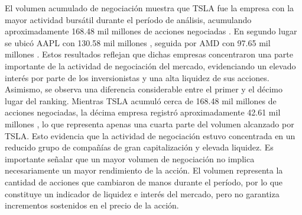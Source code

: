 El volumen acumulado de negociación muestra que
TSLA
fue la empresa con la mayor actividad bursátil durante el período de análisis, acumulando aproximadamente
168.48 mil millones de acciones negociadas
. En segundo lugar se ubicó
AAPL
con
130.58 mil millones
, seguida por
AMD
con
97.65 mil millones
. Estos resultados reflejan que dichas empresas concentraron una parte importante de la actividad de negociación del mercado, evidenciando un elevado interés por parte de los inversionistas y una alta liquidez de sus acciones.
Asimismo, se observa una diferencia considerable entre el primer y el décimo lugar del ranking. Mientras TSLA acumuló cerca de
168.48 mil millones
de acciones negociadas, la décima empresa registró aproximadamente
42.61 mil millones
, lo que representa apenas una cuarta parte del volumen alcanzado por TSLA. Esto evidencia que la actividad de negociación estuvo concentrada en un reducido grupo de compañías de gran capitalización y elevada liquidez.
Es importante señalar que un mayor volumen de negociación no implica necesariamente un mayor rendimiento de la acción. El volumen representa la cantidad de acciones que cambiaron de manos durante el período, por lo que constituye un indicador de liquidez e interés del mercado, pero no garantiza incrementos sostenidos en el precio de la acción.